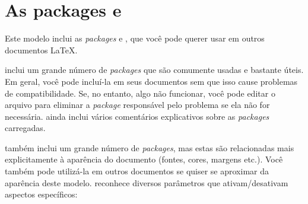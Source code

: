 
\chapter{As packages  e }
\label{ann:imegoodlooks}

Este modelo inclui as \textit{packages}  e ,
que você pode querer usar em outros documentos \LaTeX.

 inclui um grande número de \textit{packages} que são
comumente usadas e bastante úteis. Em geral, você pode incluí-la em seus
documentos sem que isso cause problemas de compatibilidade. Se, no
entanto, algo não funcionar, você pode editar o arquivo para eliminar
a \textit{package} responsável pelo problema se ela não for necessária.
 ainda inclui vários comentários explicativos sobre as
\textit{packages} carregadas.

 também inclui um grande número de \textit{packages}, mas
estas são relacionadas mais explicitamente à aparência do documento
(fontes, cores, margens etc.). Você também pode utilizá-la em outros
documentos se quiser se aproximar da aparência deste modelo. 
reconhece diversos parâmetros que ativam/desativam aspectos específicos:

